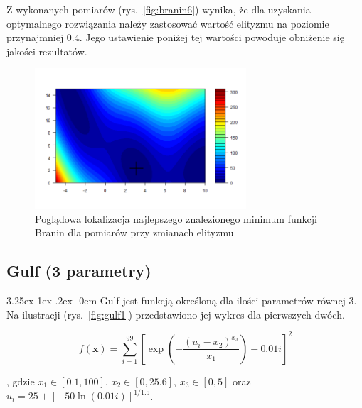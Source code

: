 \documentclass[11pt, a4paper]{article}
\makeatletter
\newcommand{\fbi}{\leavevmode{\parindent=1em\indent}}
\renewcommand\paragraph{\@startsection{paragraph}{5}{\z@}
  {3.25ex \@plus1ex \@minus.2ex}
  {-0em}
  {\normalfont\normalsize\bfseries}}
\makeatother
\begin{document}
\fbi
Z wykonanych pomiarów (rys.~\ref{fig:branin6}) wynika, że dla uzyskania optymalnego rozwiązania należy zastosować wartość elityzmu na poziomie przynajmniej 0.4. Jego ustawienie poniżej tej wartości powoduje obniżenie się jakości rezultatów.

\begin{figure}[H]
	\centering
	\includegraphics[width=0.7\textwidth]{./assets/Branin6elt.png}
	\caption{Poglądowa lokalizacja najlepszego znalezionego minimum funkcji Branin dla pomiarów przy zmianach elityzmu}
	\label{fig:branin6elt}
\end{figure}

\newpage
\subsection{Gulf (3 parametry)}
\paragraph{}
Gulf jest funkcją określoną dla ilości parametrów równej 3. Na ilustracji (rys.~\ref{fig:gulf1}) przedstawiono jej wykres dla pierwszych dwóch.

\begin{equation}\label{eq:gulf}
f(\boldsymbol{x}) = \sum_{i=1}^{99} [\exp(- \frac{(u_i - x_2)^{x_3}}{x_1}) - 0.01i]^2
\end{equation}

, gdzie $ x_1 \in [0.1, 100] $, $ x_2 \in [0, 25.6] $, $ x_3 \in [0, 5] $ oraz $ u_i = 25 + [-50 \ln (0.01i)]^{1/1.5} $.
\end{document}
